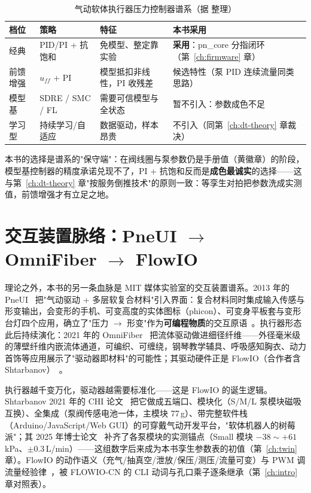 \begin{table}[htbp]
  \centering
  \caption{气动软体执行器压力控制器谱系（据 \cite{Xavier2022Frontiers} 整理）}
  \label{tab:pneu-ctrl}
  \begin{tabular}{lp{3.2cm}p{3.4cm}p{2.2cm}}
    \toprule
    档位 & 策略 & 特征 & 本书采用 \\
    \midrule
    经典 & PID/PI + 抗饱和 & 免模型、整定靠实验 & \textbf{采用}：pn\_core 分指闭环（第~\ref{ch:firmware} 章） \\
    前馈增强 & $u_{ff}$ + PI & 模型抵扣非线性，PI 收残差 & 候选特性（泵 PID 连续流量同类思路） \\
    模型基 & SDRE / SMC / FL & 需要可信模型与全状态 & 暂不引入：参数成色不足 \\
    学习型 & 持续学习/自适应 & 数据驱动，样本昂贵 & 不引入（同第~\ref{ch:dt-theory} 章裁决） \\
    \bottomrule
  \end{tabular}
\end{table}

本书的选择是谱系的"保守端"：在阀线圈与泵参数仍是手册值（黄徽章）的阶段，模型基控制器的精度承诺兑现不了，PI + 抗饱和反而是\textbf{成色最诚实}的选择——这与第~\ref{ch:dt-theory} 章"按服务倒推技术"的原则一致：等孪生对拍把参数洗成实测值，前馈增强才有立足之地。

\section{交互装置脉络：PneUI $\to$ OmniFiber $\to$ FlowIO}
\label{sec:pneu-devices}

理论之外，本书的另一条血脉是 MIT 媒体实验室的交互装置谱系。2013 年的 PneUI~\cite{Yao2013} 把"气动驱动 + 多层软复合材料"引入界面：复合材料同时集成输入传感与形变输出，会变形的手机、可变高度的实体图标（phicon）、可变身平板套与变形台灯四个应用，确立了"压力 $\to$ 形变"作为\textbf{可编程物质}的交互原语~\cite{Yao2013}。执行器形态此后持续演化：2021 年的 OmniFiber~\cite{Afsar2021} 把流体驱动做进细径纤维——外径毫米级的薄壁纤维内嵌流体通道，可编织、可缠绕，钢琴教学辅具、呼吸感知胸衣、动力首饰等应用展示了"驱动器即材料"的可能性；其驱动硬件正是 FlowIO（合作者含 Shtarbanov）~\cite{Afsar2021}。

执行器越千变万化，驱动器越需要标准化——这是 FlowIO 的诞生逻辑。Shtarbanov 2021 年的 CHI 论文~\cite{Shtarbanov2021} 把它做成五端口、模块化（S/M/L 泵模块磁吸互换）、全集成（泵阀传感电池一体，主模块 77\,g）、带完整软件栈（Arduino/JavaScript/Web GUI）的可穿戴气动开发平台，"软体机器人的树莓派"；其 2025 年博士论文~\cite{Shtarbanov2025} 补齐了各泵模块的实测锚点（Small 模块 $-38\sim+61$\,kPa、$\pm0.3$\,L/min）——这组数字后来成为本书孪生参数表的初值（第~\ref{ch:twin} 章）。FlowIO 的动作语义（充气/抽真空/泄放/保压/测压/流量可变）与 PWM 调流量经验律~\cite{Shtarbanov2021}，被 FLOWIO-CN 的 CLI 动词与孔口乘子逐条继承（第~\ref{ch:intro} 章对照表）。


